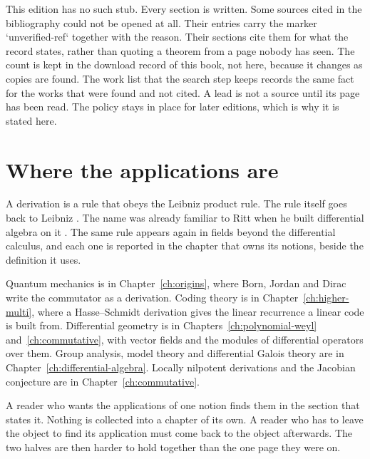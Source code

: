 This edition has no such stub. %
Every section is written. %
Some sources cited in the bibliography could not be opened at all. %
Their entries carry the marker `unverified-ref` together with the reason. %
Their sections cite them for what the record states, rather than quoting a
theorem from a page nobody has seen.
The count is kept in the download record of this book, not here, because it %
changes as copies are found.
The work list that the search step keeps records the same fact for the works %
that were found and not cited. A lead is not a source until its page has been
read.
The policy stays in place for later editions, which is why it is stated here. %

\section*{Where the applications are}

A derivation is a rule that obeys the Leibniz product rule. The rule itself
goes back to Leibniz \cite{Leibniz1684}. The name was already familiar to
Ritt when he built differential algebra on it \cite[p.~1]{Ritt1950}. The same
rule appears again in fields beyond the differential calculus, and each one is %
reported in the chapter that owns its notions, beside the definition it uses.

Quantum mechanics is in Chapter~\ref{ch:origins}, where Born, Jordan and Dirac %
write the commutator as a derivation. Coding theory is in
Chapter~\ref{ch:higher-multi}, where a Hasse--Schmidt derivation gives the
linear recurrence a linear code is built from. Differential geometry is in
Chapters~\ref{ch:polynomial-weyl} and~\ref{ch:commutative}, with vector fields
and the modules of differential operators over them. Group analysis, model
theory and differential Galois theory are in
Chapter~\ref{ch:differential-algebra}. Locally nilpotent derivations and the
Jacobian conjecture are in Chapter~\ref{ch:commutative}.

A reader who wants the applications of one notion finds them in the section %
that states it. Nothing is collected into a chapter of its own.
A reader who has to leave the object to find its application must come back to
the object afterwards. The two halves are then harder to hold together than the
one page they were on.


